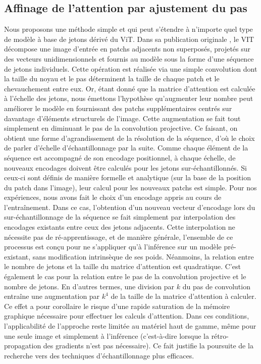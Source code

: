 \subsection{Affinage de l'attention par ajustement du pas}
\label{sec:adaptativeStride}
Nous proposons une méthode simple et qui peut s'étendre à n'importe quel type de modèle à base de jetons dérivé du ViT. Dans sa publication originale \cite{dosovitskiyImageWorth16x162020}, le \ac{VIT} décompose une image d'entrée en patchs adjacents non superposés, projetés sur des vecteurs unidimensionnels et fournis au modèle sous la forme d'une séquence de jetons individuels.
Cette opération est réalisée via une simple convolution dont la taille du noyau et le pas déterminent la taille de chaque patch et le chevauchement entre eux. Or, étant donné que la matrice d'attention est calculée à l'échelle des jetons, nous émettons l'hypothèse qu'augmenter leur nombre peut améliorer le modèle en fournissant des patchs supplémentaires centrés sur davantage d'éléments structurels de l'image. Cette augmentation se fait tout simplement en diminuant le pas de la convolution projective. Ce faisant, on obtient une forme d'agrandissement de la résolution de la séquence, d'où le choix de parler d'échelle d'échantillonnage par la suite. Comme chaque élément de la séquence est accompagné de son encodage positionnel, à chaque échelle, de nouveaux encodages doivent être calculés pour les jetons sur-échantillonnés. Si ceux-ci sont définis de manière formelle et analytique (sur la base de la position du patch dans l'image), leur calcul pour les nouveaux patchs est simple. Pour nos expériences, nous avons fait le choix d'un encodage appris au cours de l'entraînement.
Dans ce cas, l'obtention d'un nouveau vecteur d'encodage lors du sur-échantillonnage de la séquence se fait simplement par interpolation des encodages existants entre ceux des jetons adjacents. Cette interpolation ne nécessite pas de ré-apprentissage, et de manière générale, l'ensemble de ce processus est conçu pour ne s'appliquer qu'à l'inférence sur un modèle pré-existant, sans modification intrinsèque de ses poids. Néanmoins, la relation entre le nombre de jetons et la taille du matrice d'attention est quadratique. C'est également le cas pour la relation entre le pas de la convolution projective et le nombre de jetons. En d'autres termes, une division par $k$ du pas de convolution entraîne une augmentation par $k^4$ de la taille de la matrice d'attention à calculer.
Ce effet a pour corollaire le risque d'une rapide saturation de la mémoire graphique nécessaire pour effectuer les calculs d'attention.
Dans ces conditions, l'applicabilité de l'approche reste limitée au matériel haut de gamme, même pour une seule image et simplement à l'inférence (c'est-à-dire lorsque la rétro-propagation des gradients n'est pas nécessaire). Ce fait justifie la poursuite de la recherche vers des techniques d'échantillonnage plus efficaces.

